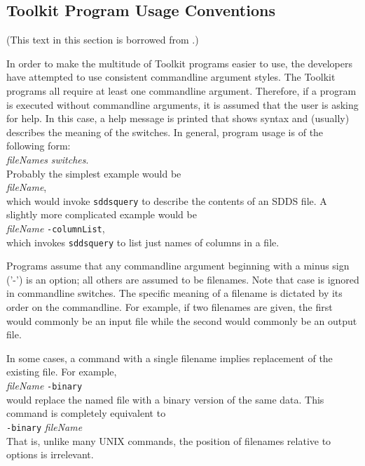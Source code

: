 \documentclass[11pt]{article}
\begin{document}
\subsection{Toolkit Program Usage Conventions}
(This text in this section is borrowed from \cite{SDDS_AP1.4}.)

In order to make the multitude of Toolkit programs easier to use, the
developers have attempted to use consistent commandline argument
styles.  The Toolkit programs all require at least one commandline
argument.  Therefore, if a program is executed without commandline
arguments, it is assumed that the user is asking for help.  In this
case, a help message is printed that shows syntax and (usually)
describes the meaning of the switches.  In general, program usage is
of the following form:\\
\hspace*{5mm}{\tt programName} {\em fileNames} {\em switches}.\\
Probably the simplest example would be \\
\hspace*{5mm}{\tt sddsquery } {\em fileName},\\
which would invoke {\tt sddsquery} to describe the contents of an SDDS file.
A slightly more complicated example would be\\
\hspace*{5mm}{\tt sddsquery } {\em fileName} {\tt -columnList},\\
which invokes {\tt sddsquery} to list just names of columns in a file.

Programs assume that any commandline argument beginning with a minus sign ('-') is an option; all others are
assumed to be filenames.  Note that case is ignored in commandline switches.  The specific meaning of a
filename is dictated by its order on the commandline.  For example, if two filenames are given, the first
would commonly be an input file while the second would commonly be an output file.

In some cases, a command with a single filename implies replacement of the existing file.  For example,\\
\hspace*{5mm}{\tt sddsconvert} {\em fileName} {\tt -binary}\\
would replace the named file with a binary version of the same data.   This command is completely equivalent to\\
\hspace*{5mm}{\tt sddsconvert} {\tt -binary} {\em fileName} \\
That is, unlike many UNIX commands, the position of filenames relative to options is irrelevant.
\end{document}

